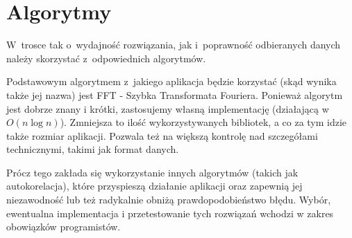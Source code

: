 \documentclass{article}
\begin{document}
\section{Algorytmy}
W~trosce tak o~wydajność rozwiązania, jak i~poprawność odbieranych danych należy
skorzystać z~odpowiednich algorytmów. \par
Podstawowym algorytmem z~jakiego aplikacja będzie korzystać (skąd wynika także
jej nazwa) jest FFT - Szybka Transformata Fouriera. Ponieważ algorytm jest dobrze znany i krótki, zastosujemy własną implementację (działającą w~$O(n\log{}n)$). Zmniejsza to ilość wykorzystywanych bibliotek, a co za tym idzie także rozmiar aplikacji. Pozwala też na większą kontrolę nad szczegółami technicznymi, takimi jak format danych. \par
Prócz tego zakłada się wykorzystanie innych algorytmów (takich jak autokorelacja), które przyspieszą
działanie aplikacji oraz zapewnią jej niezawodność lub też radykalnie obniżą
prawdopodobieństwo błędu. Wybór, ewentualna implementacja i przetestowanie tych rozwiązań wchodzi w zakres obowiązków programistów.
\end{document}
